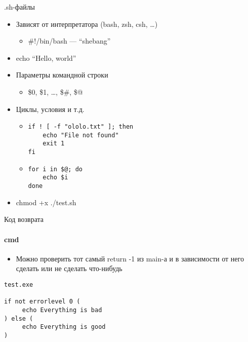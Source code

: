 \documentclass{../../slides-style}
\begin{document}
    \begin{frame}[fragile]{.sh-файлы}
        \begin{itemize}
            \item Зависят от интерпретатора (bash, zsh, csh, …)
            \begin{itemize}
                \item \#!/bin/bash --- \enquote{shebang}
            \end{itemize}
            \item echo ``Hello, world''
            \item Параметры командной строки
            \begin{itemize}
                \item \$0, \$1, …, \$\#, \$@
            \end{itemize}
            \item Циклы, условия и т.д.
            \begin{itemize}
                \item 
                \begin{footnotesize}
                    \begin{verbatim}
if ! [ -f "ololo.txt" ]; then
    echo "File not found"
    exit 1
fi
                    \end{verbatim}
                \end{footnotesize}
                \item 
                \begin{footnotesize}
                    \begin{verbatim}
for i in $@; do
    echo $i
done
                    \end{verbatim}
                \end{footnotesize}
            \end{itemize}
            \item chmod +x ./test.sh
        \end{itemize}
    \end{frame}

    \begin{frame}[fragile]{Код возврата}
        \framesubtitle{cmd}
        \begin{itemize}
            \item Можно проверить тот самый return -1 из main-а и в зависимости от него сделать или не сделать что-нибудь
        \end{itemize}
        \begin{verbatim}
test.exe

if not errorlevel 0 (
     echo Everything is bad
) else (
     echo Everything is good
)
        \end{verbatim}
    \end{frame}
\end{document}
